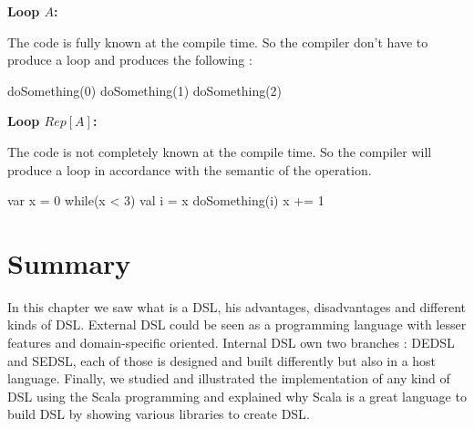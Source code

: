 \textbf{Loop $A$:}

The code  is fully known at the compile time. So
the compiler don't have to produce a loop and produces the following :
\begin{scalacode}
doSomething(0)
doSomething(1)
doSomething(2)
\end{scalacode}

\textbf{Loop $Rep[A]$:}

The code  is not completely known at
the compile time. So the compiler will produce a loop in accordance with the
semantic of the operation.
\begin{scalacode}
var x = 0
while(x < 3) {
  val i = x
  doSomething(i)
  x += 1
}
\end{scalacode}

\section{Summary}
\label{sec:dsl_summary}

In this chapter we saw what is a \gls{DSL}, his advantages, disadvantages and
different kinds of \gls{DSL}. External \gls{DSL} could be seen as a programming
language with lesser features and domain-specific oriented. Internal \gls{DSL}
own two branches : \gls{DEDSL} and \gls{SEDSL}, each of those is designed and
built differently but also in a host language. Finally, we studied and
illustrated the implementation of any kind of \gls{DSL} using the Scala
programming and explained why Scala is a great language to build \gls{DSL} by
showing various libraries to create \gls{DSL}.

